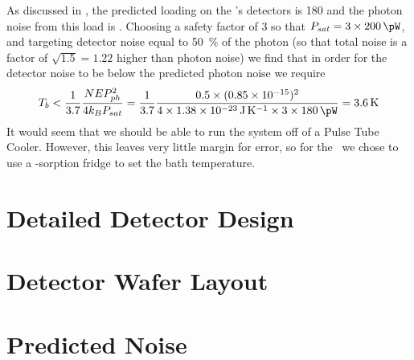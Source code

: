 As discussed in , the predicted loading on the \Imager's detectors is \SI{180}{\pW} and the photon noise from this load is .
Choosing a safety factor of 3 so that $P_{sat} = 3 \times \SI{200}{\pW}$, and targeting detector noise equal to \SI{50}{\percent} of the photon (so that total noise is a factor of $\sqrt{1.5} = 1.22$ higher than photon noise) we find that in order for the detector noise to be below the predicted photon noise we require
\begin{equation}
  T_b < \frac{1}{3.7} \frac{\NEPph^2}{4 k_B P_{sat}} =
        \frac{1}{3.7} \frac{0.5 \times (\num{0.85e-15})^2}{4 \times \SI{1.38e-23}{\J\per\K} \times 3 \times \SI{180}{\pW}} = 
        \SI{3.6}{\K}
\end{equation}
It would seem that we should be able to run the system off of a Pulse Tube Cooler.
However, this leaves very little margin for error, so for the \Imager\ we chose to use a -sorption fridge to set the bath temperature.

\section{Detailed Detector Design} \label{sec:ch5-det-design}

\section{Detector Wafer Layout} \label{sec:ch5-layout}

\section{Predicted Noise} \label{sec:ch5-predicted-noise}

